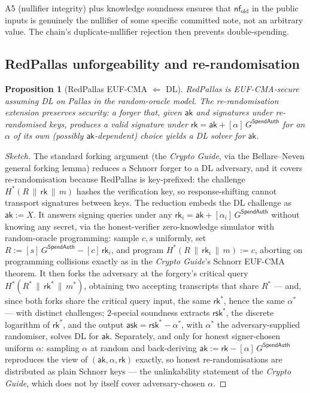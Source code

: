 \documentclass[11pt,a4paper]{article}
\newtheorem{proposition}[theorem]{Proposition}
\theoremstyle{definition}
\newcommand{\nfsym}{\mathsf{nf}}
\newcommand{\rk}{\mathsf{rk}}
\newcommand{\ask}{\ensuremath{\mathsf{ask}}}
\newcommand{\aksym}{\ensuremath{\mathsf{ak}}}
\newcommand{\rsk}{\ensuremath{\mathsf{rsk}}}
\begin{document}
A5 (nullifier integrity) plus knowledge soundness ensures that
$\nfsym_{\mathrm{old}}$ in the public inputs is genuinely the nullifier of
some specific committed note, not an arbitrary value. The chain's
duplicate-nullifier rejection then prevents double-spending.

\subsection{RedPallas unforgeability and re-randomisation}\label{sec:redpallas-sec}

\begin{proposition}[RedPallas EUF-CMA $\Leftarrow$ DL]\label{prop:redpallas}
RedPallas is EUF-CMA-secure assuming DL on Pallas in the random-oracle
model. The re-randomisation extension preserves security: a forger that,
given $\aksym$ and signatures under re-randomised keys, produces a valid
signature under $\rk = \aksym + [\alpha]\, G^{\mathsf{SpendAuth}}$ for an
$\alpha$ of its own (possibly $\aksym$-dependent) choice yields a DL
solver for $\aksym$.
\end{proposition}

\begin{proof}[Sketch]
The standard forking argument (the \emph{Crypto Guide}, via the
Bellare--Neven general forking lemma) reduces a Schnorr forger to a DL adversary, and
it covers re-randomisation because RedPallas is key-prefixed: the
challenge $H^*(R \,\|\, \rk \,\|\, m)$ hashes the verification key, so
response-shifting cannot transport signatures between keys. The reduction
embeds the DL challenge as $\aksym := X$. It answers signing queries under
any $\rk_i = \aksym + [\alpha_i]\, G^{\mathsf{SpendAuth}}$ without knowing
any secret, via the honest-verifier zero-knowledge simulator with
random-oracle programming: sample $c, s$ uniformly, set
$R := [s]\, G^{\mathsf{SpendAuth}} - [c]\, \rk_i$, and program
$H^*(R \,\|\, \rk_i \,\|\, m) := c$, aborting on programming collisions
exactly as in the \emph{Crypto Guide}'s Schnorr EUF-CMA theorem. It then
forks the adversary at the forgery's critical query
$H^*(R^* \,\|\, \rk^* \,\|\, m^*)$, obtaining two accepting transcripts
that share $R^*$ --- and, since both forks share the critical query input,
the same $\rk^*$, hence the same $\alpha^*$ --- with distinct challenges;
$2$-special soundness extracts $\rsk^*$, the discrete logarithm of
$\rk^*$, and the output $\ask = \rsk^* - \alpha^*$, with $\alpha^*$ the
adversary-supplied randomiser, solves DL for $\aksym$. Separately, and
only for honest signer-chosen uniform $\alpha$: sampling $\alpha$ at
random and back-deriving $\aksym := \rk - [\alpha]\, G^{\mathsf{SpendAuth}}$
reproduces the view of $(\aksym, \alpha, \rk)$ exactly, so honest
re-randomisations are distributed as plain Schnorr keys --- the
unlinkability statement of the \emph{Crypto Guide}, which does not by
itself cover adversary-chosen $\alpha$.
\end{proof}
\end{document}

